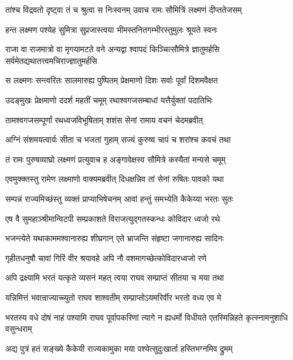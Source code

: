 \twolineshloka
{तांश्च विद्रवतो दृष्ट्वा तं च श्रुत्वा स निःस्वनम्}
{उवाच रामः सौमित्रिं लक्ष्मणं दीप्ततेजसम्} %

\twolineshloka
{हन्त लक्ष्मण पश्येह सुमित्रा सुप्रजास्त्वया}
{भीमस्तनितगम्भीरस्तुमुलः श्रूयते स्वनः} %

\threelineshloka
{राजा वा राजमात्रो वा मृगयामटते वने}
{अन्यद्वा श्वापदं किञ्चित्सौमित्रे ज्ञातुमर्हसि}
{सर्वमेतद्यथातत्त्वमचिराज्ज्ञातुमर्हसि} %

\twolineshloka
{स लक्ष्मणः सन्त्वरितः सालमारुह्य पुष्पितम्}
{प्रेक्षमाणो दिशः सर्वाः पूर्वां दिशमवैक्षत} %

\twolineshloka
{उदङ्मुखः प्रेक्षमाणो ददर्श महतीं चमूम्}
{रथाश्वगजसम्बाधां यत्तैर्युक्तां पदातिभिः} %

\twolineshloka
{तामश्वगजसम्पूर्णां रथध्वजविभूषिताम्}
{शशंस सेनां रामाय वचनं चेदमब्रवीत्} %

\twolineshloka
{अग्निं संशमयत्वार्यः सीता च भजतां गुहाम्}
{सज्यं कुरुष्व चापं च शरांश्च कवचं तथा} %

\twolineshloka
{तं रामः पुरुषव्याघ्रो लक्ष्मणं प्रत्युवाच ह}
{अङ्गावेक्षस्व सौमित्रे कस्यैतां मन्यसे चमूम्} %

\twolineshloka
{एवमुक्क्तस्तु रामेण लक्ष्माणो वाक्यमब्रवीत्}
{दिधक्षन्निव तां सेनां रुषितः पावको यथा} %

\twolineshloka
{सम्पन्नं राज्यमिच्छंस्तु व्यक्तं प्राप्याभिषेचनम्}
{आवां हन्तुं समभ्येति कैकेय्या भरतः सुतः} %

\twolineshloka
{एष वै सुमहाञ्श्रीमान्विटपी सम्प्रकाशते}
{विराजत्युद्गतस्कन्धः कोविदार ध्वजो रथे} %

\twolineshloka
{भजन्त्येते यथाकाममश्वानारुह्य शीघ्रगान्}
{एते भ्राजन्ति संहृष्टा जगानारुह्य सादिनः} %

\twolineshloka
{गृहीतधनुषौ चावां गिरिं वीर श्रयावहे}
{अपि नौ वशमागच्छेत्कोविदारध्वजो रणे} %

\twolineshloka
{अपि द्रक्ष्यामि भरतं यत्कृते व्यसनं महत्}
{त्वया राघव सम्प्राप्तं सीतया च मया तथा} %

\twolineshloka
{यन्निमित्तं भवान्राज्याच्च्युतो राघव शाश्वतीम्}
{सम्प्राप्तोऽयमरिर्वीर भरतो वध्य एव मे} %

\threelineshloka
{भरतस्य वधे दोषं नाहं पश्यामि राघव}
{पूर्वापकरिणां त्यागे न ह्यधर्मो विधीयते}
{एतस्मिन्निहते कृत्स्नामनुशाधि वसुन्धराम्} %

\twolineshloka
{अद्य पुत्रं हतं सङ्ख्ये कैकेयी राज्यकामुका}
{मया पश्येत्सुदुःखार्ता हस्तिभग्नमिव द्रुमम्} %


